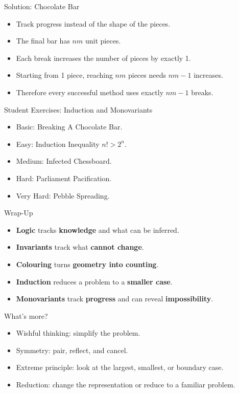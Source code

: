 \documentclass{beamer}
\begin{document}
\begin{frame}{Solution: Chocolate Bar}
    \pause
    \begin{itemize}
        \item Track progress instead of the shape of the pieces.
        \item The final bar has $nm$ unit pieces.
        \item Each break increases the number of pieces by exactly 1.
        \item Starting from 1 piece, reaching $nm$ pieces needs
            $nm-1$ increases.
        \item Therefore every successful method uses exactly $nm-1$ breaks.
    \end{itemize}
\end{frame}

\begin{frame}{Student Exercises: Induction and Monovariants}
    \begin{itemize}
        \item<1-> Basic: Breaking A Chocolate Bar.
        \item<1-> Easy: Induction Inequality $n!>2^n$.
        \item<1-> Medium: Infected Chessboard.
        \item<1-> Hard: Parliament Pacification.
        \item<1-> Very Hard: Pebble Spreading.
    \end{itemize}
\end{frame}

\begin{frame}{Wrap-Up}
    \pause
    \begin{itemize}
        \item \textbf{Logic} tracks \textbf{knowledge} and what can be inferred.
        \item \textbf{Invariants} track what \textbf{cannot change}.
        \item \textbf{Colouring} turns \textbf{geometry into counting}.
        \item \textbf{Induction} reduces a problem to a \textbf{smaller case}.
        \item \textbf{Monovariants} track \textbf{progress} and can
            reveal \textbf{impossibility}.
    \end{itemize}
\end{frame}

\begin{frame}{What's more?}
    \pause
    \begin{itemize}
        \item Wishful thinking: simplify the problem.
        \item Symmetry: pair, reflect, and cancel.
        \item Extreme principle: look at the largest, smallest, or
            boundary case.
        \item Reduction: change the representation or reduce to a
            familiar problem.
    \end{itemize}
\end{frame}
\end{document}
